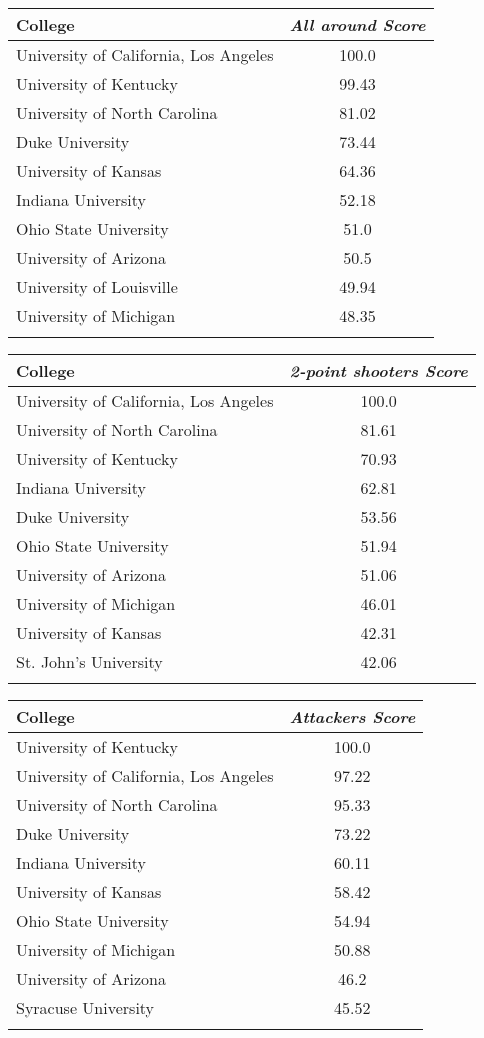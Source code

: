 \documentclass[10pt,a4paper,twocolumn]{article}
\begin{document}
\begin{table*}[t]
	\begin{tabular}{lc}
		College & \textit{All around Score}  \\
		\hline
		University of California, Los Angeles & 100.0\\
		University of Kentucky & 99.43\\
		University of North Carolina & 81.02\\
		Duke University & 73.44\\
		University of Kansas & 64.36\\
		Indiana University & 52.18\\
		Ohio State University & 51.0\\
		University of Arizona & 50.5\\
		University of Louisville & 49.94\\
		University of Michigan & 48.35\\
		&\\
		
	\end{tabular}
	
	\begin{tabular}{lc}
		College & \textit{2-point shooters Score}  \\
		\hline
		University of California, Los Angeles & 100.0\\
		University of North Carolina & 81.61\\
		University of Kentucky & 70.93\\
		Indiana University & 62.81\\
		Duke University & 53.56\\
		Ohio State University & 51.94\\
		University of Arizona & 51.06\\
		University of Michigan & 46.01\\
		University of Kansas & 42.31\\
		St. John's University & 42.06\\
		&\\
		
	\end{tabular}
	
	\begin{tabular}{lc}
		College & \textit{Attackers Score}  \\
		\hline
		University of Kentucky & 100.0\\
		University of California, Los Angeles & 97.22\\
		University of North Carolina & 95.33\\
		Duke University & 73.22\\
		Indiana University & 60.11\\
		University of Kansas & 58.42\\
		Ohio State University & 54.94\\
		University of Michigan & 50.88\\
		University of Arizona & 46.2\\
		Syracuse University & 45.52\\
		&\\
		

\end{tabular}
\end{table*}
\end{document}
